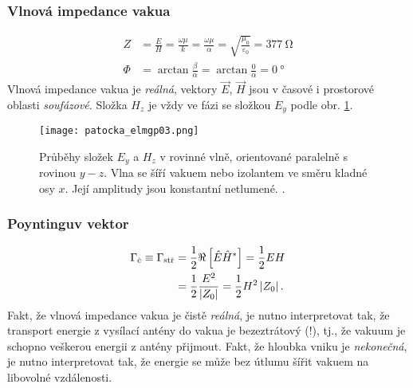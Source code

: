 {      \subsubsection{Vlnová impedance vakua}
        \begin{align}
             Z &= \frac{E}{H} = \frac{\omega\mu}{k} 
                = \frac{\omega\mu}{\alpha} 
                = \sqrt{\frac{\mu_0}{\varepsilon_0}} = \SI{377}{\ohm}  \label{ES:eq_elmagp40a} \\
          \Phi &= \arctan\frac{\beta}{\alpha} 
                = \arctan\frac{0}{\alpha} = \SI{0}{\degree}            \label{ES:eq_elmagp40b} 
        \end{align}
        Vlnová impedance vakua je \emph{reálná}, vektory \(\vec{E}\), \(\vec{H}\) jsou v časové i 
        prostorové oblasti \emph{soufázové}. Složka \(H_z\) je vždy ve fázi se složkou \(E_y\) 
        podle obr. \ref{ES:fig_elmgp03}.

        \begin{figure}[ht!]
          \centering
          \texttt{[image: patocka\_elmgp03.png]}
          \caption{Průběhy složek \(E_y\) a \(H_z\) v rovinné vlně, orientované paralelně s rovinou 
                   \(y-z\). Vlna se šíří vakuem nebo izolantem ve směru kladné osy \(x\). Její 
                   amplitudy jsou konstantní netlumené. \cite[s.~77]{Patocka4}.}
          \label{ES:fig_elmgp03}
        \end{figure}
        
      \subsubsection{Poyntinguv vektor}
        \begin{align}\label{ES:eq_elmagp41}
          \Gamma_\text{č} \equiv \Gamma_\text{stř}
            &= \frac{1}{2}\Re\left[\hat{E}\hat{H}^*\right]      
             = \frac{1}{2}EH                                            \nonumber\\
            &= \frac{1}{2}\frac{E^2}{\left\lvert Z_0\right\rvert}
            = \frac{1}{2}H^2\left\lvert Z_0\right\rvert.
        \end{align}
        Fakt, že vlnová impedance vakua je čistě \emph{reálná}, je nutno interpretovat tak, že   
        transport energie z vysílací antény do vakua je bezeztrátový (!), tj., že vakuum je schopno 
        veškerou energii z antény přijmout. Fakt, že hloubka vniku je \emph{nekonečná}, je nutno 
        interpretovat tak, že energie se může bez útlumu šířit vakuem na libovolné vzdálenosti.

}
